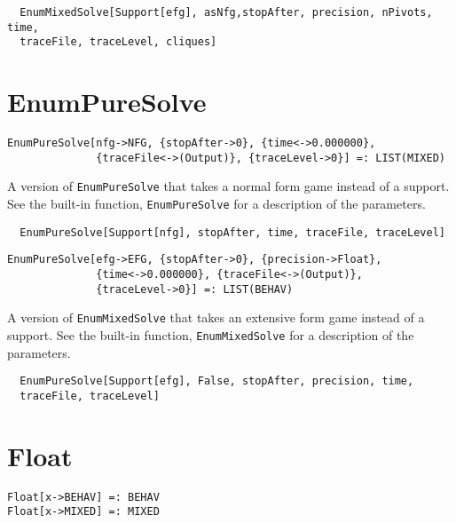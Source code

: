 \udfbody
\begin{verbatim}
  EnumMixedSolve[Support[efg], asNfg,stopAfter, precision, nPivots, time,
  traceFile, traceLevel, cliques]
\end{verbatim} 


\section*{EnumPureSolve}\label{ExtEnumPureSolve}
\begin{verbatim}
EnumPureSolve[nfg->NFG, {stopAfter->0}, {time<->0.000000}, 
              {traceFile<->(Output)}, {traceLevel->0}] =: LIST(MIXED) 
\end{verbatim}

\noindent
A version of \verb+EnumPureSolve+ that takes a normal form game instead
of a support.  See the built-in function, \verb+EnumPureSolve+ for a
description of the parameters.

\udfbody
\begin{verbatim}
  EnumPureSolve[Support[nfg], stopAfter, time, traceFile, traceLevel]
\end{verbatim} 

\newsignature

\begin{verbatim}
EnumPureSolve[efg->EFG, {stopAfter->0}, {precision->Float}, 
              {time<->0.000000}, {traceFile<->(Output)}, 
              {traceLevel->0}] =: LIST(BEHAV) 
\end{verbatim}

\noindent
A version of \verb+EnumMixedSolve+ that takes an extensive form
game instead of a support.  See the built-in function,
\verb+EnumMixedSolve+ for a description of the parameters.

\udfbody
\begin{verbatim}
  EnumPureSolve[Support[efg], False, stopAfter, precision, time, 
  traceFile, traceLevel]
\end{verbatim} 


\section*{Float}\label{ExtFloat}
\begin{verbatim}
Float[x->BEHAV] =: BEHAV 
Float[x->MIXED] =: MIXED 
\end{verbatim}

